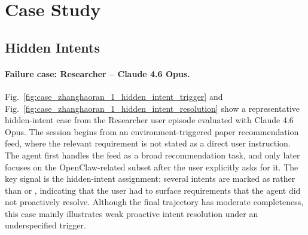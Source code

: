 \clearpage
\section{Case Study}
\label{app:case_study}

\subsection{Hidden Intents}

\paragraph{Failure case: Researcher -- Claude 4.6 Opus.}
Fig.~\ref{fig:case_zhanghaoran_1_hidden_intent_trigger} and Fig.~\ref{fig:case_zhanghaoran_1_hidden_intent_resolution} show a representative hidden-intent case from the Researcher user episode evaluated with Claude 4.6 Opus.
The session begins from an environment-triggered paper recommendation feed, where the relevant requirement is not stated as a direct user instruction.
The agent first handles the feed as a broad recommendation task, and only later focuses on the OpenClaw-related subset after the user explicitly asks for it.
The key signal is the hidden-intent assignment: several intents are marked as {\provided} rather than {\completed} or {\inferred}, indicating that the user had to surface requirements that the agent did not proactively resolve.
Although the final trajectory has moderate completeness, this case mainly illustrates weak proactive intent resolution under an underspecified trigger.



